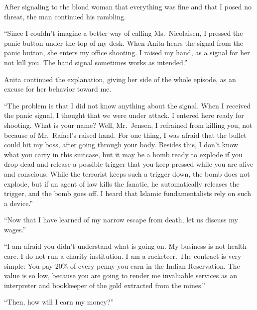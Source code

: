 \documentclass[
  12pt,
]{book}
\begin{document}
After signaling to the blond woman that everything was fine and that I
posed no threat, the man continued his rambling.

``Since I couldn't imagine a better way of calling Ms.~Nicolaisen, I
pressed the panic button under the top of my desk. When Anita hears the
signal from the panic button, she enters my office shooting. I raised my
hand, as a signal for her not kill you. The hand signal sometimes works
as intended.''

Anita continued the explanation, giving her side of the whole episode,
as an excuse for her behavior toward me.

``The problem is that I did not know anything about the signal. When I
received the panic signal, I thought that we were under attack. I
entered here ready for shooting. What is your name? Well, Mr.~Jensen, I
refrained from killing you, not because of Mr.~Rafael's raised hand. For
one thing, I was afraid that the bullet could hit my boss, after going
through your body. Besides this, I don't know what you carry in this
suitcase, but it may be a bomb ready to explode if you drop dead and
release a possible trigger that you keep pressed while you are alive and
conscious. While the terrorist keeps such a trigger down, the bomb does
not explode, but if an agent of law kills the fanatic, he automatically
releases the trigger, and the bomb goes off. I heard that Islamic
fundamentalists rely on such a device.''

``Now that I have learned of my narrow escape from death, let us discuss
my wages.''

``I am afraid you didn't understand what is going on. My business is not
health care. I do not run a charity institution. I am a racketeer. The
contract is very simple: You pay 20\% of every penny you earn in the
Indian Reservation. The value is so low, because you are going to render
me invaluable services as an interpreter and bookkeeper of the gold
extracted from the mines.''

``Then, how will I earn my money?''
\end{document}
